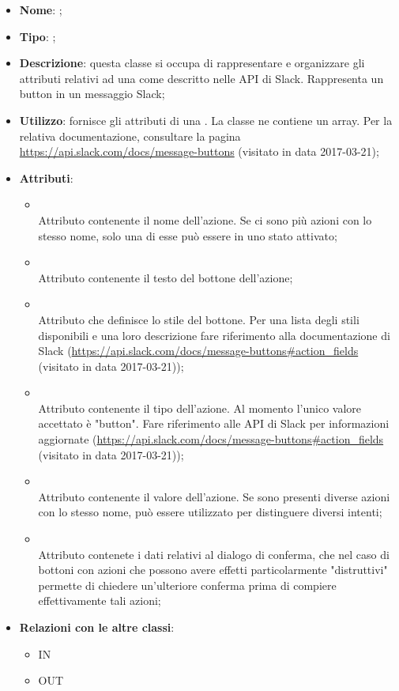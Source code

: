 \begin{itemize}
	\item \textbf{Nome}: ;
	\item \textbf{Tipo}: ;
	\item \textbf{Descrizione}: questa classe si occupa di rappresentare e organizzare gli attributi relativi ad una  come descritto nelle API di Slack. Rappresenta un button in un messaggio Slack;
	\item \textbf{Utilizzo}: fornisce gli attributi di una . La classe  ne contiene un array.
	Per la relativa documentazione, consultare la pagina \url{https://api.slack.com/docs/message-buttons}  (visitato in data 2017-03-21);
	\item \textbf{Attributi}:
	\begin{itemize}
		\item[]  \\
		Attributo contenente il nome dell'azione. Se ci sono più azioni con lo stesso nome, solo una di esse può essere in uno stato attivato;
		\item[]  \\
		Attributo contenente il testo del bottone dell'azione;
		\item[]  \\
		Attributo che definisce lo stile del bottone. Per una lista degli stili disponibili e una loro descrizione fare riferimento alla documentazione di Slack (\url{https://api.slack.com/docs/message-buttons#action_fields} (visitato in data 2017-03-21));
		\item[]  \\
		Attributo contenente il tipo dell'azione. Al momento l'unico valore accettato è "button". Fare riferimento alle API di   Slack per informazioni aggiornate (\url{https://api.slack.com/docs/message-buttons#action_fields} (visitato in data 2017-03-21));
		\item[]  \\
		Attributo contenente il valore dell'azione. Se sono presenti diverse azioni con lo stesso nome, può essere utilizzato per distinguere diversi intenti;
		\item[]  \\
		Attributo contenete i dati relativi al dialogo di conferma, che nel caso di bottoni con azioni che possono avere effetti particolarmente "distruttivi" permette di chiedere un'ulteriore conferma prima di compiere effettivamente tali azioni;
	\end{itemize}
	\item \textbf{Relazioni con le altre classi}:
	\begin{itemize}
		\item IN \hyperlink{Attachment_label}{}
		\item OUT \hyperlink{ConfirmationFields_label}{}
	\end{itemize}
\end{itemize}
\FloatBarrier

